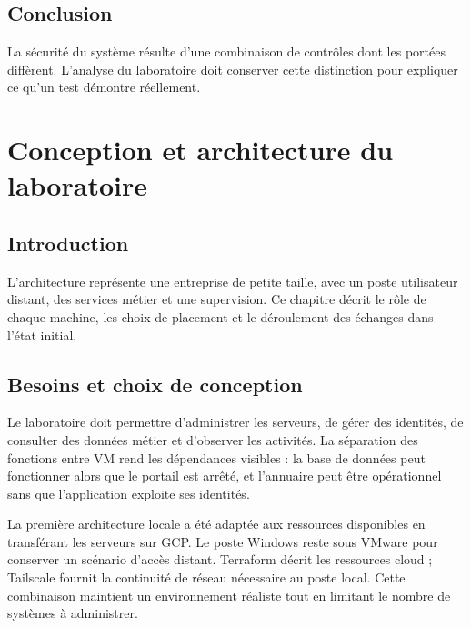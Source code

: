 \documentclass[a4paper,12pt]{report}
\begin{document}
\section*{Conclusion}
La sécurité du système résulte d'une combinaison de contrôles dont les portées diffèrent. L'analyse du laboratoire doit conserver cette distinction pour expliquer ce qu'un test démontre réellement.

\chapter{Conception et architecture du laboratoire}
\section*{Introduction}
L'architecture représente une entreprise de petite taille, avec un poste utilisateur distant, des services métier et une supervision. Ce chapitre décrit le rôle de chaque machine, les choix de placement et le déroulement des échanges dans l'état initial.

\section{Besoins et choix de conception}
Le laboratoire doit permettre d'administrer les serveurs, de gérer des identités, de consulter des données métier et d'observer les activités. La séparation des fonctions entre VM rend les dépendances visibles : la base de données peut fonctionner alors que le portail est arrêté, et l'annuaire peut être opérationnel sans que l'application exploite ses identités.

La première architecture locale a été adaptée aux ressources disponibles en transférant les serveurs sur GCP. Le poste Windows reste sous VMware pour conserver un scénario d'accès distant. Terraform décrit les ressources cloud ; Tailscale fournit la continuité de réseau nécessaire au poste local. Cette combinaison maintient un environnement réaliste tout en limitant le nombre de systèmes à administrer.
\end{document}

